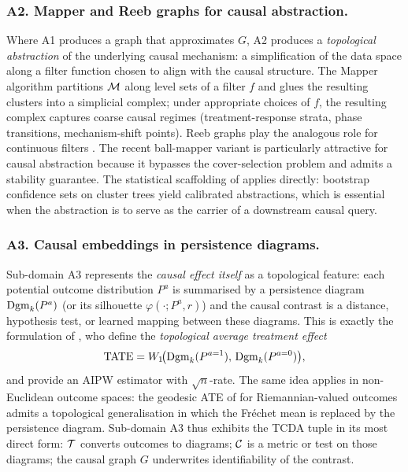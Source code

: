 \subsubsection*{A2. Mapper and Reeb graphs for causal abstraction.}
Where A1 produces a graph that approximates $G$, A2 produces a
\emph{topological abstraction} of the underlying causal mechanism: a
simplification of the data space along a filter function chosen to
align with the causal structure. The Mapper algorithm
\citep{singh2007mapper,carriere2018statistical} partitions $\mathcal{M}$ along
level sets of a filter $f$ and glues the resulting clusters into a
simplicial complex; under appropriate choices of $f$, the resulting
complex captures coarse causal regimes (treatment-response strata,
phase transitions, mechanism-shift points). Reeb graphs play the
analogous role for continuous filters \citep{biasotti2008reeb,
morozov2013interleaving}. The recent ball-mapper variant
\citep{dlotko2019ball} is particularly attractive for causal abstraction
because it bypasses the cover-selection problem and admits a stability
guarantee. The statistical scaffolding of \citet{lecci2014statistical}
applies directly: bootstrap confidence sets on cluster trees yield
calibrated abstractions, which is essential when the abstraction is to
serve as the carrier of a downstream causal query.

\subsubsection*{A3. Causal embeddings in persistence diagrams.}
Sub-domain A3 represents the \emph{causal effect itself} as a
topological feature: each potential outcome distribution $P^a$ is
summarised by a persistence diagram $\mathrm{Dgm}_{k}(P^a)$ (or its silhouette
$\varphi(\cdot;P^a,r)$) and the causal contrast is a distance,
hypothesis test, or learned mapping between these diagrams. This is
exactly the formulation of \citet{kim2026topological}, who define the
\emph{topological average treatment effect}
\[
\operatorname{TATE} = W_1\!\bigl(\mathrm{Dgm}_{k}(P^{a=1}),\,\mathrm{Dgm}_{k}(P^{a=0})\bigr),
\]
and provide an AIPW estimator with $\sqrt n$-rate. The same idea applies
in non-Euclidean outcome spaces: the geodesic ATE of
\citet{kurisu2024geodesic} for Riemannian-valued outcomes admits a
topological generalisation in which the Fr\'echet mean is replaced by
the persistence diagram. Sub-domain A3 thus exhibits the TCDA tuple in
its most direct form: $\mathcal{T}$ converts outcomes to diagrams; $\mathcal{C}$ is a
metric or test on those diagrams; the causal graph $G$ underwrites
identifiability of the contrast.

